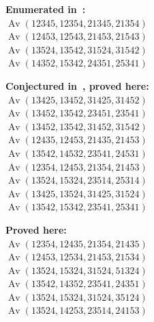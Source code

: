 \documentclass[11pt]{article}
\theoremstyle{definition}
\numberwithin{theorem}{section}
\numberwithin{question}{section}
\numberwithin{definition}{section}
\numberwithin{example}{section}
\numberwithin{remark}{section}
\newcommand{\Av}{\operatorname{Av}}
\begin{document}
\begin{multicols}{2}
\textbf{Enumerated in~\cite{chen:length-5-patts-and-inv-201-210}:}\\
\hspace*{0.2in} $\Av(12345, 12354, 21345, 21354)$\\
\hspace*{0.2in} $\Av(12453, 12543, 21453, 21543)$\\
\hspace*{0.2in} $\Av(13524, 13542, 31524, 31542)$\\
\hspace*{0.2in} $\Av(14352, 15342, 24351, 25341)$
	
\textbf{Conjectured in~\cite{chen:length-5-patts-and-inv-201-210}, proved here:}\\
\hspace*{0.2in} $\Av(13425, 13452, 31425, 31452)$\\
\hspace*{0.2in} $\Av(13452, 13542, 23451, 23541)$\\
\hspace*{0.2in} $\Av(13452, 13542, 31452, 31542)$\\
\hspace*{0.2in} $\Av(12435, 12453, 21435, 21453)$\\
\hspace*{0.2in} $\Av(13542, 14532, 23541, 24531)$\\
\hspace*{0.2in} $\Av(12354, 12453, 21354, 21453)$\\
\hspace*{0.2in} $\Av(13524, 15324, 23514, 25314)$\\
\hspace*{0.2in} $\Av(13425, 13524, 31425, 31524)$\\
\hspace*{0.2in} $\Av(13542, 15342, 23541, 25341)$

\textbf{Proved here:}\\
\hspace*{0.2in} $\Av(12354, 12435, 21354, 21435)$\\
\hspace*{0.2in} $\Av(12453, 12534, 21453, 21534)$\\
\hspace*{0.2in} $\Av(13524, 15324, 31524, 51324)$\\
\hspace*{0.2in} $\Av(13542, 14352, 23541, 24351)$\\
\hspace*{0.2in} $\Av(13524, 15324, 31524, 35124)$\\
\hspace*{0.2in} $\Av(13524, 14253, 23514, 24153)$


\end{multicols}
\end{document}
